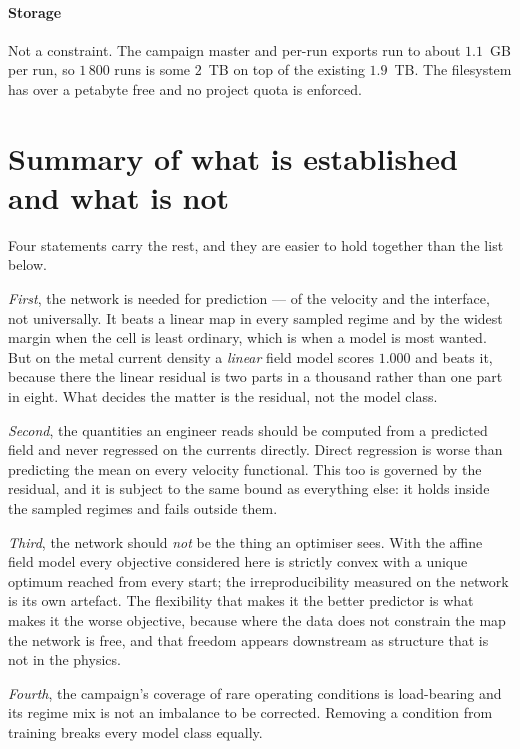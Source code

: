 \documentclass[11pt,a4paper]{article}
\theoremstyle{plain}
\theoremstyle{definition}
\theoremstyle{remark}
\begin{document}
\paragraph{Storage}
Not a constraint. The campaign master and per-run exports run to about
$1.1$~GB per run, so $1\,800$ runs is some $2$~TB on top of the existing
$1.9$~TB. The filesystem has over a petabyte free and no project quota is
enforced.

\section{Summary of what is established and what is not}
\label{auto:summary-of-what-is-established-and-what}

Four statements carry the rest, and they are easier to hold together than the
list below.

\emph{First}, the network is needed for prediction --- of the velocity and the
interface, not universally. It beats a linear map in every sampled regime and by
the widest margin when the cell is least ordinary, which is when a model is most
wanted. But on the metal current density a \emph{linear} field model scores
$1.000$ and beats it, because there the linear residual is two parts in a
thousand rather than one part in eight. What decides the matter is the residual,
not the model class.

\emph{Second}, the quantities an engineer reads should be computed from a
predicted field and never regressed on the currents directly. Direct regression
is worse than predicting the mean on every velocity functional. This too is
governed by the residual, and it is subject to the same bound as everything
else: it holds inside the sampled regimes and fails outside them.

\emph{Third}, the network should \emph{not} be the thing an optimiser sees. With
the affine field model every objective considered here is strictly convex with a
unique optimum reached from every start; the irreproducibility measured on the
network is its own artefact. The flexibility that makes it the better predictor
is what makes it the worse objective, because where the data does not constrain
the map the network is free, and that freedom appears downstream as structure
that is not in the physics.

\emph{Fourth}, the campaign's coverage of rare operating conditions is
load-bearing and its regime mix is not an imbalance to be corrected. Removing a
condition from training breaks every model class equally.
\end{document}
